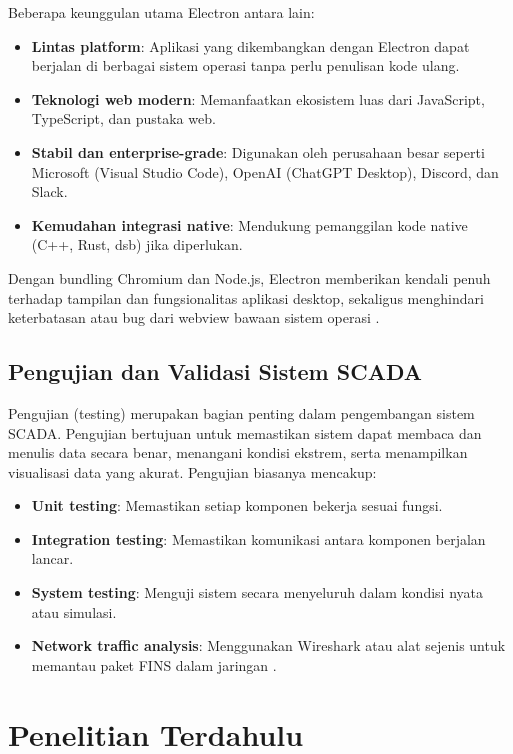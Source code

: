 Beberapa keunggulan utama Electron antara lain:

\begin{itemize}
\item \textbf{Lintas platform}: Aplikasi yang dikembangkan dengan Electron dapat berjalan di berbagai sistem operasi tanpa perlu penulisan kode ulang.
\item \textbf{Teknologi web modern}: Memanfaatkan ekosistem luas dari JavaScript, TypeScript, dan pustaka web.
\item \textbf{Stabil dan enterprise-grade}: Digunakan oleh perusahaan besar seperti Microsoft (Visual Studio Code), OpenAI (ChatGPT Desktop), Discord, dan Slack.
\item \textbf{Kemudahan integrasi native}: Mendukung pemanggilan kode native (C++, Rust, dsb) jika diperlukan.
\end{itemize}

Dengan bundling Chromium dan Node.js, Electron memberikan kendali penuh terhadap tampilan dan fungsionalitas aplikasi desktop, sekaligus menghindari keterbatasan atau bug dari webview bawaan sistem operasi \parencite{electron2024why}.

\subsection{Pengujian dan Validasi Sistem SCADA}
Pengujian (testing) merupakan bagian penting dalam pengembangan sistem SCADA. Pengujian bertujuan untuk memastikan sistem dapat membaca dan menulis data secara benar, menangani kondisi ekstrem, serta menampilkan visualisasi data yang akurat. Pengujian biasanya mencakup:

\begin{itemize}
    \item \textbf{Unit testing}: Memastikan setiap komponen bekerja sesuai fungsi.
    \item \textbf{Integration testing}: Memastikan komunikasi antara komponen berjalan lancar.
    \item \textbf{System testing}: Menguji sistem secara menyeluruh dalam kondisi nyata atau simulasi.
    \item \textbf{Network traffic analysis}: Menggunakan Wireshark atau alat sejenis untuk memantau paket FINS dalam jaringan \parencite{almas2014open}.
\end{itemize}

\section{Penelitian Terdahulu}

